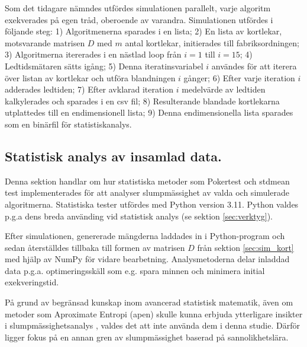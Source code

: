 \documentclass[swedish,a4paper]{article}
\begin{document}
Som det tidagare nämndes utfördes simulationen parallelt, varje algoritm
exekverades på egen tråd, oberoende av varandra.
Simulationen utfördes i följande steg: 
1) Algoritmenerna sparades i en lista;
2) En lista av kortlekar, motsvarande matrisen $D$ med $m$ antal kortlekar, initierades till fabriksordningen; 
3) Algoritmerna itererades i en nästlad loop från $i = 1$ till $i = 15$; 
4) Ledtidsmätaren sätts igång;
5) Denna iteratinsvariabel $i$ användes för att iterera över listan av kortlekar
och utföra blandningen $i$ gånger;
6) Efter varje iteration $i$ adderades ledtiden;
7) Efter avklarad iteration $i$ medelvärde av ledtiden kalkylerades och
sparades i en csv fil;
8) Resulterande blandade kortlekarna utplattedes till en endimensionell lista;
9) Denna endimensionella lista sparades som en binärfil för statistiskanalys.

%


\subsection{Statistisk analys av insamlad data.}
Denna sektion handlar om hur statistiska metoder som Pokertest och
\gls{stdmean} test implementerades för att analyser slumpmässighet av valda och
simulerade algoritmerna. Statistiska tester utfördes med Python version 3.11.
Python valdes p.g.a dens breda använding vid statistisk analys (se sektion
\ref{sec:verktyg}).

Efter simulationen, genererade mängderna laddades in i Python-program och sedan återställdes tillbaka till
formen av matrisen $D$ från sektion \ref{sec:sim_kort} med hjälp av NumPy för vidare
bearbetning. Analysmetoderna delar inladdad data p.g.a. optimeringsskäll som e.g.
spara minnen och minimera initial exekveringstid.

På grund av begränsad kunskap inom avancerad statistisk matematik,
även om metoder som Aproximate Entropi (\gls{apen}) skulle kunna erbjuda
ytterligare insikter i slumpmässighetsanalys \parencite{ApEn}, valdes det att
inte använda dem i denna studie. Därför ligger fokus på en
annan gren av slumpmässighet baserad på
sannolikhetslära. %
\end{document}
